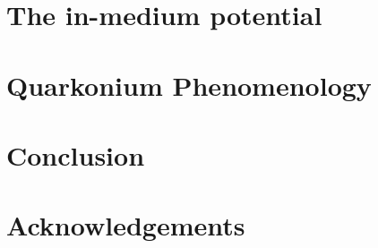 \documentclass[11pt, a4paper, twoside]{book}
\begin{document}
\chapter{The in-medium potential}
\label{sec:med_pot}
\onehalfspacing
\chapter{Quarkonium Phenomenology}
\label{sec:quark_pheno}
\onehalfspacing
\chapter{Conclusion}
\label{sec:conc}
\onehalfspacing




\chapter*{Acknowledgements}


\cleardoublepage

\end{document}
